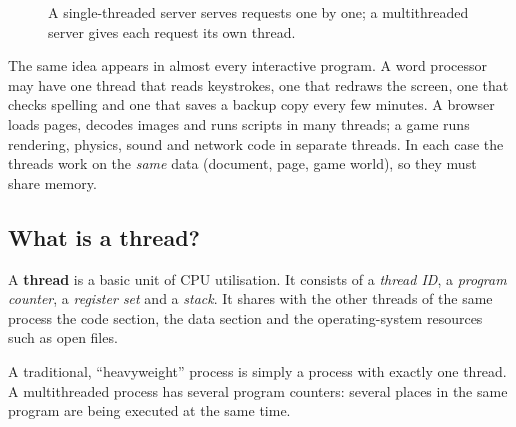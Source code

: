 \documentclass[11pt,a4paper]{article}
\begin{document}
\begin{figure}[H]
\centering
{}
\caption{A single-threaded server serves requests one by one; a multithreaded server gives each request its own thread.}
\end{figure}

The same idea appears in almost every interactive program. A word processor may have one thread that reads keystrokes, one that redraws the screen, one that checks spelling and one that saves a backup copy every few minutes. A browser loads pages, decodes images and runs scripts in many threads; a game runs rendering, physics, sound and network code in separate threads. In each case the threads work on the \emph{same} data (document, page, game world), so they must share memory.

\subsection{What is a thread?}

\begin{keyidea}[Definition]
A \textbf{thread} is a basic unit of CPU utilisation. It consists of a \emph{thread ID}, a \emph{program counter}, a \emph{register set} and a \emph{stack}. It shares with the other threads of the same process the code section, the data section and the operating-system resources such as open files.
\end{keyidea}

A traditional, ``heavyweight'' process is simply a process with exactly one thread. A multithreaded process has several program counters: several places in the same program are being executed at the same time.
\end{document}
